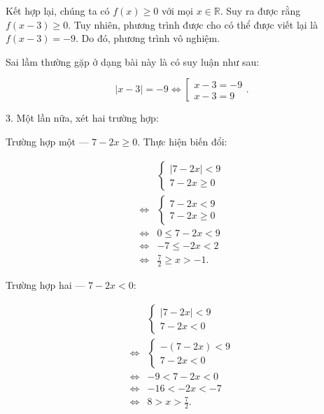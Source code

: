Kết hợp lại, chúng ta có $f(x) \geq 0$ với mọi $x \in \mathbb{R}$. Suy ra được rằng $f(x - 3) \geq 0$. Tuy nhiên, phương trình được cho có thể được viết lại là $f(x - 3) = -9$. Do đó, phương trình vô nghiệm.

Sai lầm thường gặp ở dạng bài này là có suy luận như sau:

\begin{equation*}
   |x - 3| = -9 \iff \left[\begin{array}{l}
      x - 3 = -9 \\
      x - 3 = 9
   \end{array}\right..
\end{equation*}

3. Một lần nữa, xét hai trường hợp:

\textcolor{colorEmphasisCyan}{Trường hợp một --- $7 - 2x \geq 0$}. Thực hiện biến đổi:

\begin{align*}
   &\begin{cases}
      |7 - 2x| < 9 \\
      7 - 2x \geq 0
   \end{cases} \\
   \iff &\begin{cases}
      7 - 2x < 9 \\
      7 - 2x \geq 0
   \end{cases} \\
   \iff &0 \leq 7 - 2x < 9 \\
   \iff &-7 \leq -2x < 2 \\
   \iff &\frac{7}{2} \geq x > -1.
\end{align*}

\textcolor{colorEmphasis}{Trường hợp hai --- $7 - 2x < 0$}:

\begin{align*}
   &\begin{cases}
      |7 - 2x| < 9 \\
      7 - 2x < 0
   \end{cases} \\
   \iff &\begin{cases}
      - (7 - 2x) < 9 \\
      7 - 2x < 0
   \end{cases} \\
   \iff & -9 < 7 - 2x < 0 \\
   \iff & -16 < -2x < -7 \\
   \iff & 8 > x > \frac{7}{2}.
\end{align*}

